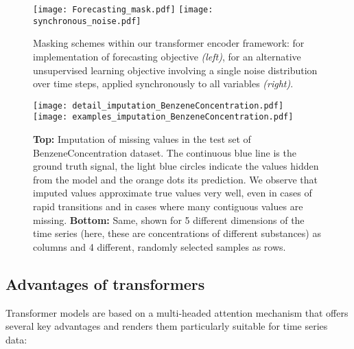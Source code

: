 \documentclass{article} \usepackage{iclr2021_conference,times}
\begin{document}
\begin{figure}[h]
    \centering
    \texttt{[image: Forecasting\_mask.pdf]}
    \hspace{5mm}
    \texttt{[image: synchronous\_noise.pdf]}
    \caption{Masking schemes within our transformer encoder framework: for implementation of forecasting objective \textit{(left)}, for an alternative unsupervised learning objective involving a single noise distribution over time steps, applied synchronously to all variables \textit{(right)}.}
    \label{fig:forecasting_mask}
\end{figure}


\begin{figure}[ht]
    \centering
    \texttt{[image: detail\_imputation\_BenzeneConcentration.pdf]}\\
    \hspace*{-1.3in}
    \texttt{[image: examples\_imputation\_BenzeneConcentration.pdf]}
    \caption{\textbf{Top:} Imputation of missing values in the test set of BenzeneConcentration dataset. The continuous blue line is the ground truth signal, the light blue circles indicate the values hidden from the model and the orange dots its prediction. We observe that imputed values approximate true values very well, even in cases of rapid transitions and in cases where many contiguous values are missing. \textbf{Bottom:} Same, shown for 5 different dimensions of the time series (here, these are concentrations of different substances) as columns and 4 different, randomly selected samples as rows.}
    \label{fig:imputation}
\end{figure}

\FloatBarrier

\subsection{Advantages of transformers}\label{sec:transformer_advantages}

Transformer models are based on a multi-headed attention mechanism that offers several key advantages and renders them particularly suitable for time series data:
\end{document}
